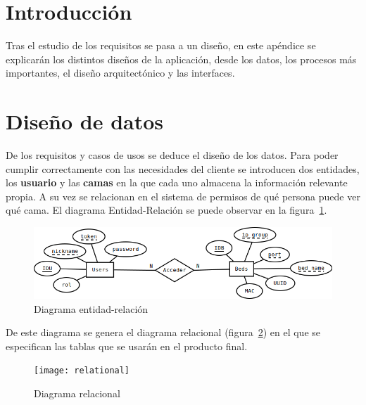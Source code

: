 
\section{Introducción}

Tras el estudio de los requisitos se pasa a un diseño, en este apéndice se explicarán los distintos diseños de la aplicación, desde los datos, los procesos más importantes, el diseño arquitectónico y las interfaces.

\section{Diseño de datos}

De los requisitos y casos de usos se deduce el diseño de los datos. Para poder cumplir correctamente con las necesidades del cliente se introducen dos entidades, los \textbf{usuario} y las \textbf{camas} en la que cada uno almacena la información relevante propia. A su vez se relacionan en el sistema de permisos de qué persona puede ver qué cama. El diagrama Entidad-Relación se puede observar en la figura~\ref{fig:erDia}.

\begin{figure}
	\centering
	\includegraphics[width=\textwidth]{img/entidad-relacion.png}
	\caption{Diagrama entidad-relación}
	\label{fig:erDia}
\end{figure}

De este diagrama se genera el diagrama relacional (figura~\ref{fig:relational}) en el que se especifican las tablas que se usarán en el producto final.

\begin{figure}
	\centering
	\texttt{[image: relational]}
	\caption{Diagrama relacional}
	\label{fig:relational}
\end{figure}


